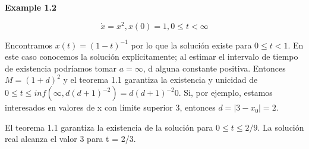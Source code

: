 \documentclass{beamer}
\begin{document}
\begin{frame}
\textbf{Example 1.2}

\[
\dot{x} = x^2 , x(0) = 1, 0 \leq t < \infty
\]

Encontramos $x(t) = (1 - t)^{-1}$ por lo que la solución existe para $0 \leq t < 1$. En este caso conocemos la solución explícitamente; al estimar el intervalo de tiempo de existencia podríamos tomar $a = \infty$, d alguna constante positiva. Entonces $M = (1 + d)^2$ y el teorema 1.1 garantiza la existencia y unicidad de $0 \leq t \leq inf(\infty, d(d+1)^{-2}) = d(d+1) ^{-2}$0. Si, por ejemplo, estamos interesados en valores de x con límite superior 3, entonces $d = |3 - x_0 | = 2$.

El teorema 1.1 garantiza la existencia de la solución para $0 \leq t \leq 2/9$. La solución real alcanza el valor 3 para t = 2/3.
\end{frame}

\begin{frame}

\end{frame}

\begin{frame}

\end{frame}

\begin{frame}

\end{frame}

\begin{frame}

\end{frame}

\begin{frame}

\end{frame}

\begin{frame}

\end{frame}

\begin{frame}

\end{frame}
\end{document}

